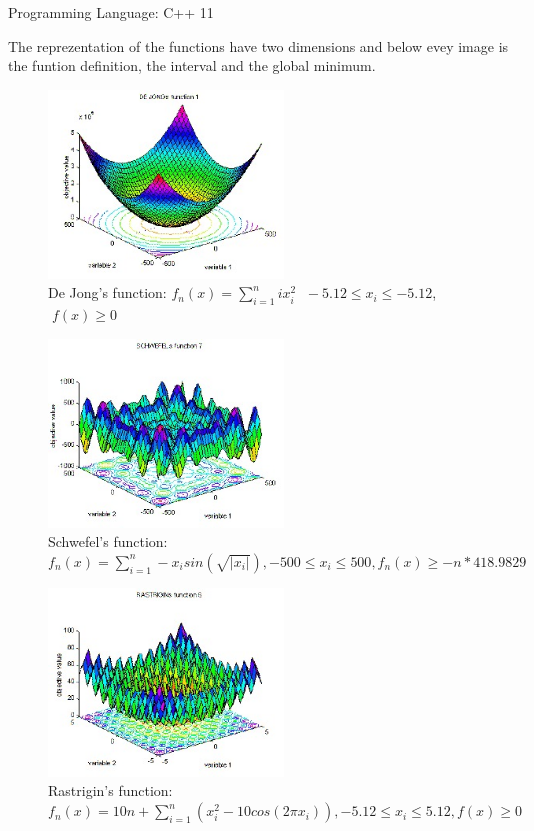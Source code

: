 \documentclass[12pt,leqno]{article}
\begin{document}
  Programming Language: C++ 11

  The reprezentation of the functions have two dimensions and below evey image is the funtion definition, the interval and the global minimum.
  
  \begin{figure}[bp!]
    \centering
    \includegraphics[width=0.4\linewidth, height=5cm]{dejong.jpg} 
    \caption*{De Jong's function: $ f_n(x) = \sum_{i=1}^{n} i x_i^2 $ $\; -5.12 \leq x_i \leq -5.12 $, $\; f(x) \geq 0 $}
  \end{figure}
  
\vfill

\begin{figure}[bp!]
  \centering
  \includegraphics[width=0.4\linewidth, height=5cm]{schwefel.jpg}
  \caption*{Schwefel's function: $ f_n(x) = \sum_{i = 1}^{n}-x_i sin(\sqrt{|x_i|}) , -500 \leq x_i \leq 500 , f_n(x) \geq -n * 418.9829$}
\end{figure}
    
\newpage
\vfill

\begin{figure}[bp!]
  \centering
  \includegraphics[width=0.4\linewidth, height=5cm]{rastrigin.jpg} 
  \caption*{Rastrigin's function: $ f_n(x) = 10n + \sum_{i = 1}^{n}(x_i^2 - 10 cos(2 \pi x_i)), -5.12 \leq x_i \leq 5.12, f(x) \geq 0 $}
\end{figure}
    
\end{document}
